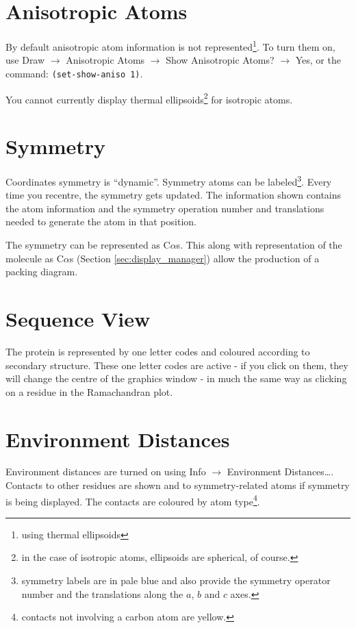 \documentclass{book}
\begin{document}
\section{Anisotropic Atoms}
 By default anisotropic atom information is
not represented\footnote{using thermal ellipsoids}.  To turn them on,
use \textsf{Draw $\rightarrow$ Anisotropic Atoms $\rightarrow$ Show
  Anisotropic Atoms?  $\rightarrow$ Yes}, or the command:
\texttt{(set-show-aniso 1)}.

You cannot currently display thermal ellipsoids\footnote{in the case
  of isotropic atoms, ellipsoids are spherical, of course.} for
isotropic atoms.

\section{Symmetry}
 Coordinates symmetry is ``dynamic''.  Symmetry atoms
can be labeled\footnote{symmetry labels are in pale blue and also
  provide the symmetry operator number and the translations along the
  $a$, $b$ and $c$ axes.}.  Every time you recentre, the symmetry gets
updated.  The information shown contains the atom information and the
symmetry operation number and translations needed to generate the atom
in that position.

The symmetry can be represented as C$\alpha$s.  This along with representation of the molecule as
C$\alpha$s (Section \ref{sec:display_manager}) allow the production of
a packing diagram.

\section{Sequence View}
 The protein is represented by one letter codes
and coloured according to secondary structure.  These one letter codes
are active - if you click on them, they will change the centre of the
graphics window - in much the same way as clicking on a residue in the
Ramachandran plot.

\section{Environment Distances}
Environment distances are turned on using \textsf{Info $\rightarrow$
  Environment Distances\ldots}.  Contacts to other residues are shown
and to symmetry-related atoms if symmetry is being displayed.  The
contacts are coloured by atom type\footnote{contacts not involving a
  carbon atom are yellow.}.
\end{document}
